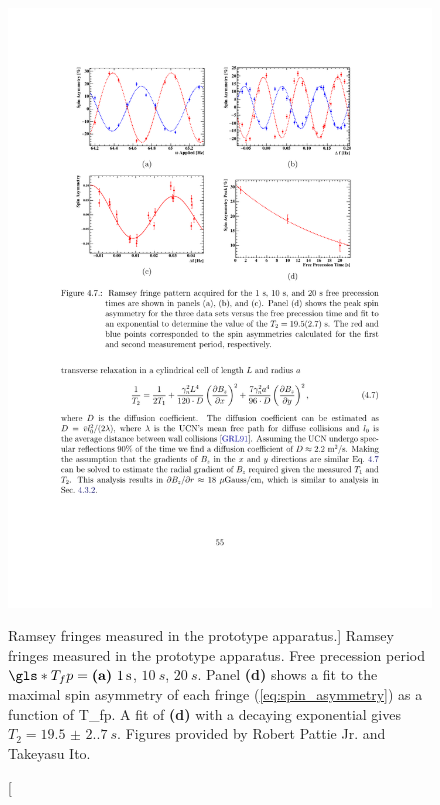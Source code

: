 \begin{figure}[hbp]
    \centering
    \includegraphics[width=\textwidth]{figures/2017_ramsey_fringes.pdf}
    \caption
    [Ramsey fringes measured in the prototype apparatus.]
    {Ramsey fringes measured in the prototype apparatus. Free precession period $\gls*{T_fp}=\text{\textbf{(a)} }\qty{1}{s}$, $\qty{10}{s}$, $\qty{20}{s}$. Panel \textbf{(d)} shows a fit to the maximal spin asymmetry of each fringe (\ref{eq:spin_asymmetry}) as a function of \gls*{T_fp}. A fit of \textbf{(d)} with a decaying exponential gives $T_2=\qty{19.5(2.7)}{s}$. Figures provided by Robert Pattie Jr. and Takeyasu Ito.}
    \label{fig:ramsey_fringes_2017}
\end{figure}